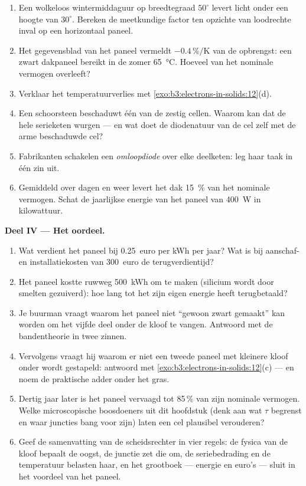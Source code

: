 \begin{problem}
\begin{enumerate}[resume]
  \item Een wolkeloos wintermiddaguur op breedtegraad $50^\circ$ levert
        licht onder een hoogte van $30^\circ$. Bereken de meetkundige
        factor ten opzichte van loodrechte inval op een horizontaal
        paneel.
  \item Het gegevensblad van het paneel vermeldt $-0.4\,\%/\text{K}$ van de opbrengst:
        een zwart dakpaneel bereikt in de zomer \qty{65}{\celsius}.
        Hoeveel van het nominale vermogen overleeft?
  \item Verklaar het temperatuurverlies met
        \cref{exo:b3:electrons-in-solids:12}(d).
  \item Een schoorsteen beschaduwt één van de zestig cellen. Waarom kan dat
        de hele serieketen wurgen --- en wat doet de
        diodenatuur van de cel zelf met de arme beschaduwde cel?
  \item Fabrikanten schakelen een \emph{omloopdiode} over elke
        deelketen: leg haar taak in één zin uit.
  \item Gemiddeld over dagen en weer levert het dak
        \qty{15}{\percent} van het nominale vermogen. Schat de jaarlijkse
        energie van het paneel van \qty{400}{W} in kilowattuur.
\end{enumerate}

\medskip\noindent\textbf{Deel IV --- Het oordeel.}

\begin{enumerate}[resume]
  \item Wat verdient het paneel bij \qty{0.25}{euro} per kWh
        per jaar? Wat is bij aanschaf- en installatiekosten van \qty{300}{euro}
        de terugverdientijd?
  \item Het paneel kostte ruwweg \qty{500}{kWh} om te maken
        (silicium wordt door smelten gezuiverd): hoe lang tot het
        zijn eigen energie heeft terugbetaald?
  \item Je buurman vraagt waarom het paneel niet
        ``gewoon zwart gemaakt'' kan worden om het vijfde deel onder de kloof te vangen. Antwoord
        met de bandentheorie in twee zinnen.
  \item Vervolgens vraagt hij waarom er niet een tweede paneel met kleinere kloof
        onder wordt gestapeld: antwoord met
        \cref{exo:b3:electrons-in-solids:12}(c) --- en noem de
        praktische adder onder het gras.
  \item Dertig jaar later is het paneel vervaagd tot 85\,\% van zijn
        nominale vermogen. Welke microscopische boosdoeners uit dit hoofdstuk
        (denk aan wat $\tau$ begrenst en waar juncties bang voor zijn)
        laten een cel plausibel verouderen?
  \item Geef de samenvatting van de scheidsrechter in vier regels: de fysica van de kloof
        bepaalt de oogst, de junctie zet die om, de seriebedrading
        en de temperatuur belasten haar, en het grootboek --- energie
        en euro's --- sluit in het voordeel van het paneel.
\end{enumerate}
\end{problem}
